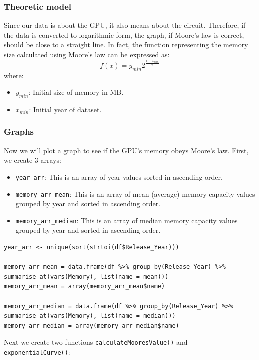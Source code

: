 \documentclass[a4paper]{article}
\begin{document}
\subsubsection{Theoretic model}
Since our data is about the GPU, it also means about the circuit. Therefore, if the data is converted to logarithmic form, the graph, if Moore's law is correct, should be close to a straight line. In fact, the function representing the memory size calculated using Moore's law can be expressed as:
\begin{equation*}
    f(x)=y_{min}2^{\frac{x-x_{min}}{2}}
\end{equation*}
where:
\begin{itemize}
    \item $y_{min}$: Initial size of memory in MB.
    \item $x_{min}$: Initial year of dataset.
\end{itemize}
\subsubsection{Graphs}
Now we will plot a graph to see if the GPU's memory obeys Moore's law. First, we create 3 arrays:
\begin{itemize}
    \item \verb|year_arr|: This is an array of year values sorted in ascending order.
    \item \verb|memory_arr_mean|: This is an array of mean (average) memory capacity values grouped by year and sorted in ascending order.
    \item \verb|memory_arr_median|: This is an array of median memory capacity values grouped by year and sorted in ascending order.
\end{itemize}
\begin{mdframed}[leftline=false,rightline=false,backgroundcolor=lightblue!10,nobreak=false]
    \begin{verbatim}
year_arr <- unique(sort(strtoi(df$Release_Year)))

memory_arr_mean = data.frame(df %>% group_by(Release_Year) %>% summarise_at(vars(Memory), list(name = mean)))
memory_arr_mean = array(memory_arr_mean$name)

memory_arr_median = data.frame(df %>% group_by(Release_Year) %>% summarise_at(vars(Memory), list(name = median)))
memory_arr_median = array(memory_arr_median$name)
    \end{verbatim}
\end{mdframed}
Next we create two functions \verb|calculateMooresValue()| and \verb|exponentialCurve()|:
\end{document}
